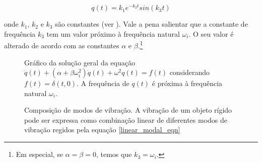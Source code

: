 \begin{equation}
	q(t) = k_1 e^{-k_2t} sin(k_3t)
\end{equation}

onde $k_1$, $k_2$ e $k_3$ são constantes (ver ). Vale a pena salientar que a constante de frequência $k_3$ tem um valor próximo à frequência natural $\omega_i$. O seu valor é alterado de acordo com as constantes $\alpha$ e $\beta$.\footnote{Em especial, se $\alpha = \beta = 0$, temos que $k_3 = \omega_i$.}

\begin{figure}[ht]
	\centering
	
	\caption[Gráfico da solução da equação $\ddot{q}(t) + (\alpha + \beta\omega_i^2)\dot{q}(t) + \omega^2q(t) = f(t)$]{Gráfico da solução geral da equação $\ddot{q}(t) + (\alpha + \beta\omega_i^2)\dot{q}(t) + \omega^2q(t) = f(t)$ considerando $f(t) = \delta(t, 0)$. A frequência de $q(t)$ é próxima à frequência natural $\omega_i$.}\label{wave_mode}
\end{figure}

\begin{figure}[ht]
	\centering
	
	\caption[Composição de modos de vibração]{Composição de modos de vibração. A vibração de um objeto rígido pode ser expressa como combinação linear de diferentes modos de vibração regidos pela equação \eqref{linear_modal_eqn}}\label{plate_modes}
\end{figure}



